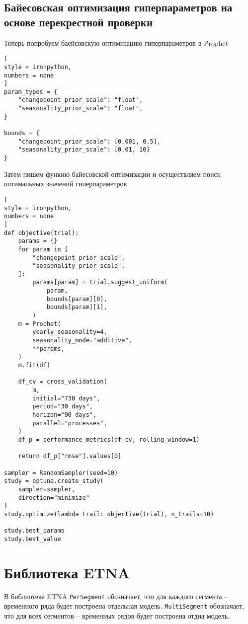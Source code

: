 \documentclass[%
	11pt,
	a4paper,
	utf8,
		]{article}
\begin{document}
\subsection{Байесовская оптимизация гиперпараметров на основе перекрестной проверки}

Теперь попробуем баейсовскую оптимизацию гиперпараметров в Prophet
\begin{lstlisting}[
style = ironpython,
numbers = none
]
param_types = {
    "changepoint_prior_scale": "float",
    "seasonality_prior_scale": "float",
}

bounds = {
    "changepoint_prior_scale": [0.001, 0.5],
    "seasonality_prior_scale": [0.01, 10]
}
\end{lstlisting}

Затем пишем функию байесовской оптимизации и осуществляем поиск оптимальных значений гиперпараметров
\begin{lstlisting}[
style = ironpython,
numbers = none	
]
def objective(trial):
    params = {}
    for param in [
        "changepoint_prior_scale",
        "seasonality_prior_scale",
    ]:
	    params[param] = trial.suggest_uniform(
	        param,
	        bounds[param][0],
	        bounds[param][1],
	    )
	m = Prophet(
	    yearly_seasonality=4,
	    seasonality_mode="additive",
	    **params,
	)
	m.fit(df)
	
	df_cv = cross_validation(
	    m,
	    initial="730 days",
	    period="30 days",
	    horizon="90 days",
	    parallel="processes",
	)
	df_p = performance_metrics(df_cv, rolling_window=1)
	
	return df_p["rmse"].values[0]
    
sampler = RandomSampler(seed=10)
study = optuna.create_study(
    sampler=sampler,
    direction="minimize"
)
study.optimize(lambda trail: objective(trial), n_trails=10)

study.best_params
study.best_value
\end{lstlisting}

\section{Библиотека ETNA}

В библиотеке ETNA \verb|PerSegment| обозначает, что для каждого сегмента -- временного ряда будет построена отдельная модель. \verb|MultiSegment| обозначает, что для всех сегментов -- временных рядов будет построена отдна модель.
\end{document}

